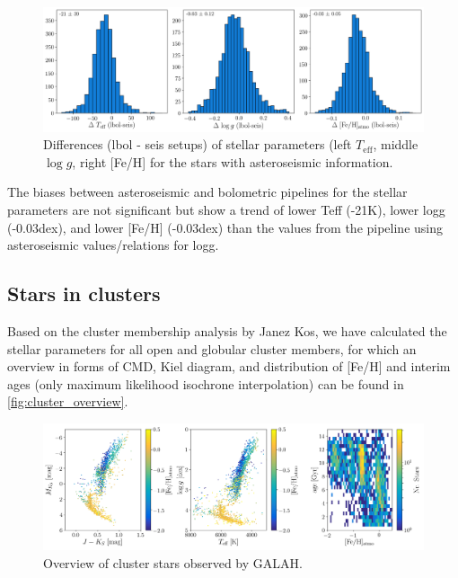 \documentclass[a4paper,11pt,english]{article}
\begin{document}
\begin{figure}[!ht]
\centering
\includegraphics[width=\textwidth]{../../seis/figures/seis_setup_difference_lbol.png}
\caption{Differences (lbol - seis setups) of stellar parameters (left $T_\text{eff}$, middle $\log g$, right [Fe/H] for the stars with asteroseismic information.}
\label{fig:seis_comparison3}
\end{figure}

The biases between asteroseismic and bolometric pipelines for the stellar parameters are not significant but show a trend of lower Teff (-21K), lower logg (-0.03dex), and lower [Fe/H] (-0.03dex) than the values from the pipeline using asteroseismic values/relations for logg.

\subsection{Stars in clusters}

Based on the cluster membership analysis by Janez Kos, we have calculated the stellar parameters for all open and globular cluster members, for which an overview in forms of CMD, Kiel diagram, and distribution of [Fe/H] and interim ages (only maximum likelihood isochrone interpolation) can be found in \autoref{fig:cluster_overview}.

\begin{figure}[!ht]
\centering
\includegraphics[width=\textwidth]{../../clusters/figures/CMD_Kiel_FehAge.png}
\caption{Overview of cluster stars observed by GALAH.}
\label{fig:cluster_overview}
\end{figure}
\end{document}
